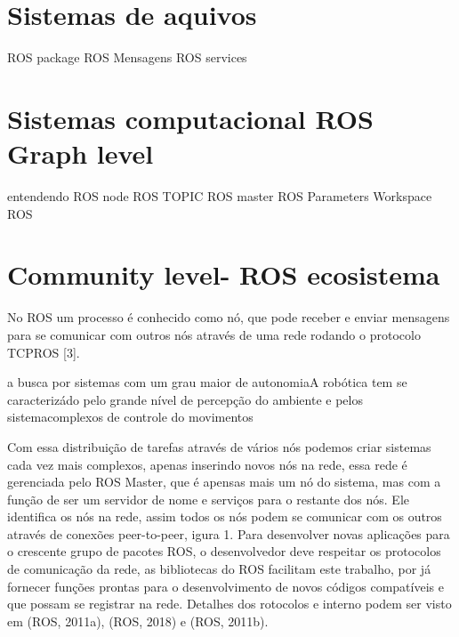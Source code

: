 \section{Sistemas de aquivos}
ROS package
ROS Mensagens
ROS services

\section{Sistemas computacional ROS Graph level}
entendendo ROS node
ROS TOPIC
ROS master
ROS Parameters
Workspace ROS


\section{Community level- ROS ecosistema}


















No ROS um processo é conhecido como nó, que pode receber e enviar mensagens para se comunicar com outros nós através de uma rede rodando o protocolo TCPROS [3].










a busca por sistemas com um grau maior de autonomiaA robótica tem se caracterizádo pelo grande nível de percepção do ambiente e pelos sistemacomplexos de controle do movimentos 

Com essa distribuição de tarefas através de vários nós podemos criar sistemas cada vez mais complexos, apenas inserindo novos nós na rede, essa rede é gerenciada pelo ROS Master, que é apensas mais um nó do sistema, mas com a função de ser um servidor de nome e serviços para o restante dos nós. Ele identifica os nós na rede, assim todos os nós podem se comunicar com os outros através de conexões peer-to-peer, igura 1. Para desenvolver novas aplicações para o crescente grupo de pacotes ROS, o desenvolvedor deve respeitar os protocolos de comunicação da rede, as bibliotecas do ROS facilitam este trabalho, por já fornecer funções prontas para o desenvolvimento de novos códigos compatíveis e que possam se registrar na rede. Detalhes dos  rotocolos e interno podem ser visto em (ROS, 2011a), (ROS, 2018) e (ROS, 2011b).

